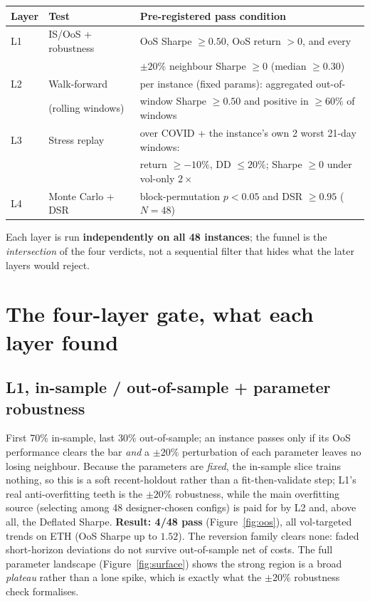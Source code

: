 \documentclass[11pt]{article}
\begin{document}
\begin{center}\small
\begin{tabular}{@{}lll@{}}
\toprule
\textbf{Layer} & \textbf{Test} & \textbf{Pre-registered pass condition} \\
\midrule
L1 & IS/OoS + robustness & OoS Sharpe $\ge 0.50$, OoS return $>0$, and every \\
  &           & $\pm20\%$ neighbour Sharpe $\ge 0$ (median $\ge 0.30$) \\
L2 & Walk-forward    & per instance (fixed params): aggregated out-of- \\
  & (rolling windows)  & window Sharpe $\ge 0.50$ and positive in $\ge 60\%$ of windows \\
L3 & Stress replay    & over COVID + the instance's own 2 worst 21-day windows: \\
  &           & return $\ge -10\%$, DD $\le 20\%$; Sharpe $\ge 0$ under vol-only $2\times$ \\
L4 & Monte Carlo + DSR  & block-permutation $p<0.05$ and DSR $\ge 0.95$ ($N{=}48$) \\
\bottomrule
\end{tabular}
\end{center}

Each layer is run \textbf{independently on all 48 instances}; the funnel is the
\emph{intersection} of the four verdicts, not a sequential filter that hides what the
later layers would reject.

\section{The four-layer gate, what each layer found}

\subsection{L1, in-sample / out-of-sample + parameter robustness}
First 70\% in-sample, last 30\% out-of-sample; an instance passes only if its OoS
performance clears the bar \emph{and} a $\pm20\%$ perturbation of each parameter
leaves no losing neighbour. Because the parameters are \emph{fixed}, the in-sample
slice trains nothing, so this is a soft recent-holdout rather than a fit-then-validate
step; L1's real anti-overfitting teeth is the $\pm20\%$ robustness, while the main
overfitting source (selecting among 48 designer-chosen configs) is paid for by L2 and,
above all, the Deflated Sharpe. \textbf{Result: 4/48 pass} (Figure~\ref{fig:oos}), all
vol-targeted trends on ETH (OoS Sharpe up to $1.52$). The reversion family clears
none: faded short-horizon deviations do not survive out-of-sample net of costs. The
full parameter landscape (Figure~\ref{fig:surface}) shows the strong region is a
broad \emph{plateau} rather than a lone spike, which is exactly what the $\pm20\%$
robustness check formalises.
\end{document}
